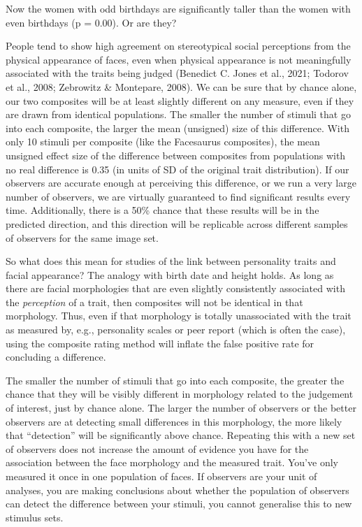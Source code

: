 \documentclass[
  doc,floatsintext]{apa6}
\begin{document}
Now the women with odd birthdays are significantly taller than the women with even birthdays (p = 0.00). Or are they?

People tend to show high agreement on stereotypical social perceptions from the physical appearance of faces, even when physical appearance is not meaningfully associated with the traits being judged (Benedict C. Jones et al., 2021; Todorov et al., 2008; Zebrowitz \& Montepare, 2008). We can be sure that by chance alone, our two composites will be at least slightly different on any measure, even if they are drawn from identical populations. The smaller the number of stimuli that go into each composite, the larger the mean (unsigned) size of this difference. With only 10 stimuli per composite (like the Facesaurus composites), the mean unsigned effect size of the difference between composites from populations with no real difference is 0.35 (in units of SD of the original trait distribution). If our observers are accurate enough at perceiving this difference, or we run a very large number of observers, we are virtually guaranteed to find significant results every time. Additionally, there is a 50\% chance that these results will be in the predicted direction, and this direction will be replicable across different samples of observers for the same image set.

So what does this mean for studies of the link between personality traits and facial appearance? The analogy with birth date and height holds. As long as there are facial morphologies that are even slightly consistently associated with the \emph{perception} of a trait, then composites will not be identical in that morphology. Thus, even if that morphology is totally unassociated with the trait as measured by, e.g., personality scales or peer report (which is often the case), using the composite rating method will inflate the false positive rate for concluding a difference.

The smaller the number of stimuli that go into each composite, the greater the chance that they will be visibly different in morphology related to the judgement of interest, just by chance alone. The larger the number of observers or the better observers are at detecting small differences in this morphology, the more likely that ``detection'' will be significantly above chance. Repeating this with a new set of observers does not increase the amount of evidence you have for the association between the face morphology and the measured trait. You've only measured it once in one population of faces. If observers are your unit of analyses, you are making conclusions about whether the population of observers can detect the difference between your stimuli, you cannot generalise this to new stimulus sets.
\end{document}
